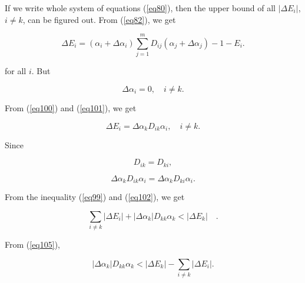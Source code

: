 \documentclass [18pt]{article}
\begin{document}
If we write whole system of equations (\ref{eq80}), then the upper bound of all
$\left| {\Delta E_i } \right|$, $i \ne k$, can be figured out. From (\ref{eq82}), we
get


\begin{equation}
\label{eq100}
\Delta E_i = (\alpha _i + \Delta \alpha _i )\sum\limits_{j = 1}^m {D_{ij}
(\alpha _j + \Delta \alpha _j )} - 1 - E_i .
\end{equation}



\noindent
for all $i$. But


\begin{equation}
\label{eq101}
\Delta \alpha _i = 0,
\quad
i \ne k.
\end{equation}



From (\ref{eq100}) and (\ref{eq101}), we get


\begin{equation}
\label{eq102}
\Delta E_i = \Delta \alpha _k D_{ik} \alpha _i ,
\quad
i \ne k.
\end{equation}



Since


\begin{equation}
\label{eq103}
D_{ik} = D_{ki} ,
\end{equation}




\begin{equation}
\label{eq104}
\Delta \alpha _k D_{ik} \alpha _i = \Delta \alpha _k D_{ki} \alpha _i .
\end{equation}



From the inequality (\ref{eq99}) and (\ref{eq102}), we get


\begin{equation}
\label{eq105}
\sum\limits_{i \ne k} {\left| {\Delta E_i } \right| + \left| {\Delta \alpha
_k } \right|D_{kk} \alpha _k < \left| {\Delta E_k } \right|} \quad .
\end{equation}



From (\ref{eq105}),


\begin{equation}
\label{eq106}
\left| {\Delta \alpha _k } \right|D_{kk} \alpha _k < \left| {\Delta E_k }
\right| - \sum\limits_{i \ne k} {\left| {\Delta E_i } \right|} .
\end{equation}
\end{document}
